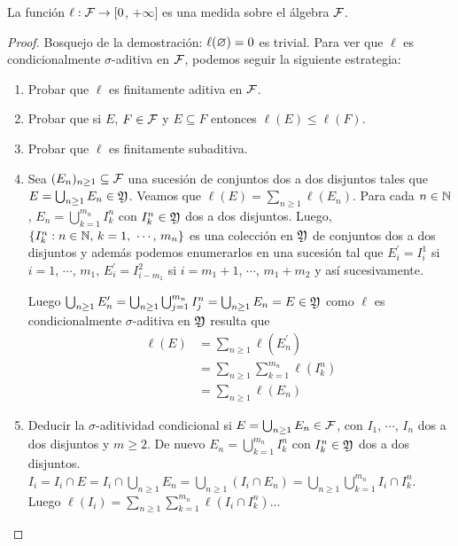 \begin{lemma}
    La función $\ell : \mathcal{F} \to [0$, $+\infty]$ es una medida sobre el álgebra $\mathcal{F}$.
    \begin{proof}
        Bosquejo de la demostración: $\ell(\varnothing) = 0$ es trivial.
        Para ver que $\ell$ es condicionalmente $\sigma$-aditiva en $\mathcal{F}$, podemos seguir la siguiente estrategia: \begin{enumerate}
            \item Probar que $\ell$ es finitamente aditiva en $\mathcal{F}$.
            \item Probar que si $E$, $F \in \mathcal{F}$ y $E \subseteq F$ entonces $\ell(E) \leq \ell(F)$.
            \item Probar que $\ell$ es finitamente subaditiva.
            \item Sea $(E_n)_{n \geq 1} \subseteq \mathcal{F}$ una sucesión de conjuntos dos a dos disjuntos tales que $E = \bigcup_{n \geq 1} E_n \in \mathfrak{Y}$. Veamos que
                  $\ell(E) = \sum_{n \geq 1} \ell(E_n)$. Para cada $n \in \mathbb{N}$, $E_n = \bigcup_{k = 1}^{m_n} I_k^n$ con $I_k^n \in \mathfrak{Y}$ dos a dos disjuntos.
                  Luego, $\{ I_k^n : n \in \mathbb{N} \text{, } k = 1 \text{, } \cdots \text{, } m_n \}$ es una colección en $\mathfrak{Y}$ de conjuntos dos a dos disjuntos y además podemos enumerarlos en una sucesión tal que
                  $E_i^\prime = I_i^1$ si $i = 1$, $\cdots$, $m_1$, $E_i^\prime = I_{i - m_1}^2$ si $i = m_1 + 1$, $\cdots$, $m_1 + m_2$ y así sucesivamente.

                  Luego $\bigcup_{n \geq 1} E_n^\prime = \bigcup_{n \geq 1} \bigcup_{j = 1}^{m_n} I_j^n = \bigcup_{n \geq 1} E_n = E \in \mathfrak{Y}$ como $\ell$ es condicionalmente $\sigma$-aditiva en $\mathfrak{Y}$ resulta que \begin{align*}
                      \ell(E) & = \sum_{n \geq 1} \ell(E_n^\prime)               \\
                              & = \sum_{n \geq 1} \sum_{k = 1}^{m_n} \ell(I_k^n) \\
                              & = \sum_{n \geq 1} \ell(E_n)
                  \end{align*}
            \item Deducir la $\sigma$-aditividad condicional si $E = \bigcup_{n \geq 1} E_n \in \mathcal{F}$, con $I_1$, $\cdots$, $I_n$ dos a dos disjuntos y $m \geq 2$.
                  De nuevo $E_n = \bigcup_{k = 1}^{m_n} I_k^n$ con $I_k^n \in \mathfrak{Y}$ dos a dos disjuntos. \\
                  $I_i = I_i \cap E = I_i \cap \bigcup_{n \geq 1} E_n = \bigcup_{n \geq 1} (I_i \cap E_n) = \bigcup_{n \geq 1} \bigcup_{k = 1}^{m_n} I_i \cap I_k^n$. \\
                  Luego $\ell(I_i) = \sum_{n \geq 1} \sum_{k = 1}^{m_n} \ell(I_i \cap I_k^n)$...
        \end{enumerate}
    \end{proof}
\end{lemma}